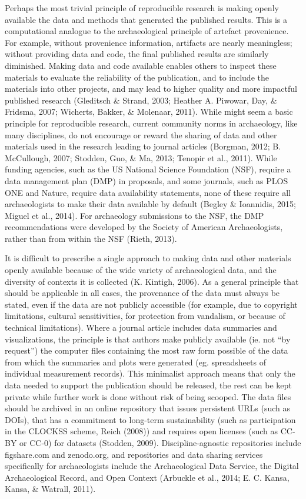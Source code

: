 \documentclass[american,man]{apa6}
\newcounter{author}
\begin{document}
Perhaps the most trivial principle of reproducible research is making
openly available the data and methods that generated the published
results. This is a computational analogue to the archaeological
principle of artefact provenience. For example, without provenience
information, artifacts are nearly meaningless; without providing data
and code, the final published results are similarly diminished. Making
data and code available enables others to inspect these materials to
evaluate the reliability of the publication, and to include the
materials into other projects, and may lead to higher quality and more
impactful published research (Gleditsch \& Strand, 2003; Heather A.
Piwowar, Day, \& Fridsma, 2007; Wicherts, Bakker, \& Molenaar, 2011).
While might seem a basic principle for reproducible research, current
community norms in archaeology, like many disciplines, do not encourage
or reward the sharing of data and other materials used in the research
leading to journal articles (Borgman, 2012; {B.} {McCullough}, 2007;
Stodden, Guo, \& Ma, 2013; Tenopir et al., 2011). While funding
agencies, such as the US National Science Foundation (NSF), require a
data management plan (DMP) in proposals, and some journals, such as PLOS
ONE and Nature, require data availability statements, none of these
require all archaeologists to make their data available by default
(Begley \& Ioannidis, 2015; Miguel et al., 2014). For archaeology
submissions to the NSF, the DMP recommendations were developed by the
Society of American Archaeologists, rather than from within the NSF
(Rieth, 2013).

It is difficult to prescribe a single approach to making data and other
materials openly available because of the wide variety of archaeological
data, and the diversity of contexts it is collected (K. Kintigh, 2006).
As a general principle that should be applicable in all cases, the
provenance of the data must always be stated, even if the data are not
publicly accessible (for example, due to copyright limitations, cultural
sensitivities, for protection from vandalism, or because of technical
limitations). Where a journal article includes data summaries and
visualizations, the principle is that authors make publicly available
(ie. not \enquote{by request}) the computer files containing the most
raw form possible of the data from which the summaries and plots were
generated (eg. spreadsheets of individual measurement records). This
minimalist approach means that only the data needed to support the
publication should be released, the rest can be kept private while
further work is done without risk of being scooped. The data files
should be archived in an online repository that issues persistent URLs
(such as DOIs), that has a commitment to long-term sustainability (such
as participation in the CLOCKSS scheme, Reich (2008)) and requires open
licenses (such as CC-BY or CC-0) for datasets (Stodden, 2009).
Discipline-agnostic repositories include figshare.com and zenodo.org,
and repositories and data sharing services specifically for
archaeologists include the Archaeological Data Service, the Digital
Archaeological Record, and Open Context (Arbuckle et al., 2014; E. C.
Kansa, Kansa, \& Watrall, 2011).
\end{document}
